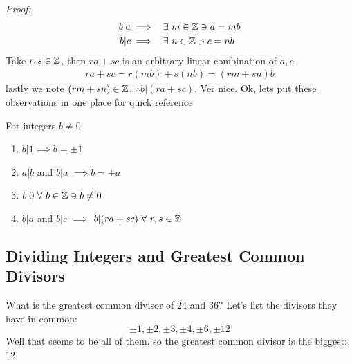 \noindent \textit{Proof:}
\begin{align}
    b|a &\implies \ \ \exists \ m \in {\mathbb{Z}} \ni a=mb \nonumber \\
    b|c &\implies \ \ \exists \ n \in {\mathbb{Z}} \ni c=nb \nonumber
\end{align}
Take $r,s\in {\mathbb{Z}}$, then $ra+sc$ is an arbitrary linear combination of $a,c$.
\begin{align}
    ra+sc=r(mb)+s(nb)=(rm+sn)b\nonumber
\end{align}
lastly we note $(rm+sn)\in {\mathbb{Z}}$, $\therefore b|(ra+sc)$.
\noindent Ver nice. Ok, lets put these observations in one place for quick reference
\begin{proposition}
For integers $b\neq 0$
\begin{enumerate}
    \item $b|1\implies b=\pm 1$
    \item $a|b$ and $b|a$ $\implies b=\pm a$
    \item $b|0 \ \forall \ b \in {\mathbb{Z}} \ni b\neq 0$
    \item $b|a$ and $b|c$ $\implies$ $b|(ra+sc) \ \forall \ r,s \in {\mathbb{Z}}$
\end{enumerate}
\end{proposition}

\subsection{Dividing Integers and Greatest Common Divisors}
What is the greatest common divisor of $24$ and $36$? Let's list the divisors they have in common:
\begin{equation}
    \pm 1, \pm 2, \pm 3, \pm 4, \pm 6, \pm 12 \nonumber
\end{equation}
Well that seems to be all of them, so the greatest common divisor is the biggest: $12$\steezybreak

